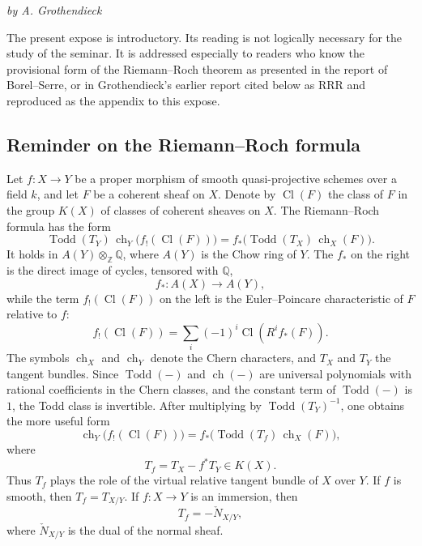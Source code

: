 \documentclass[14pt]{extarticle}
\newcommand{\ZZ}{\mathbb Z}
\newcommand{\QQ}{\mathbb Q}
\newcommand{\Cl}{\operatorname{Cl}}
\newcommand{\ch}{\operatorname{ch}}
\newcommand{\Todd}{\operatorname{Todd}}
\begin{document}
\begin{center}
\emph{by A. Grothendieck}
\end{center}

The present expose is introductory. Its reading is not logically necessary for the study of the seminar. It is addressed especially to readers who know the provisional form of the Riemann--Roch theorem as presented in the report of Borel--Serre, or in Grothendieck's earlier report cited below as RRR and reproduced as the appendix to this expose.

\subsection{Reminder on the Riemann--Roch formula}

Let $f:X\to Y$ be a proper morphism of smooth quasi-projective schemes over a field $k$, and let $F$ be a coherent sheaf on $X$. Denote by $\Cl(F)$ the class of $F$ in the group $K(X)$ of classes of coherent sheaves on $X$. The Riemann--Roch formula has the form
\begin{equation}\label{eq:RR1en}
\Todd(T_Y)\,\ch_Y\bigl(f_!(\Cl(F))\bigr)=
   f_*\bigl(\Todd(T_X)\,\ch_X(F)\bigr).
\end{equation}
It holds in $A(Y)\otimes_{\ZZ}\QQ$, where $A(Y)$ is the Chow ring of $Y$. The $f_*$ on the right is the direct image of cycles, tensored with $\QQ$,
\[
   f_*:A(X)\longrightarrow A(Y),
\]
while the term $f_!(\Cl(F))$ on the left is the Euler--Poincare characteristic of $F$ relative to $f$:
\[
   f_!(\Cl(F))=\sum_i(-1)^i\Cl(R^if_*(F)).
\]
The symbols $\ch_X$ and $\ch_Y$ denote the Chern characters, and $T_X$ and $T_Y$ the tangent bundles. Since $\Todd(-)$ and $\ch(-)$ are universal polynomials with rational coefficients in the Chern classes, and the constant term of $\Todd(-)$ is $1$, the Todd class is invertible. After multiplying by $\Todd(T_Y)^{-1}$, one obtains the more useful form
\begin{equation}\label{eq:RR2en}
\ch_Y\bigl(f_!(\Cl(F))\bigr)=
   f_*\bigl(\Todd(T_f)\,\ch_X(F)\bigr),
\end{equation}
where
\begin{equation}\label{eq:Tfen}
   T_f=T_X-f^*T_Y\in K(X).
\end{equation}
Thus $T_f$ plays the role of the virtual relative tangent bundle of $X$ over $Y$. If $f$ is smooth, then $T_f=T_{X/Y}$. If $f:X\to Y$ is an immersion, then
\[
   T_f=-\check N_{X/Y},
\]
where $\check N_{X/Y}$ is the dual of the normal sheaf.
\end{document}
